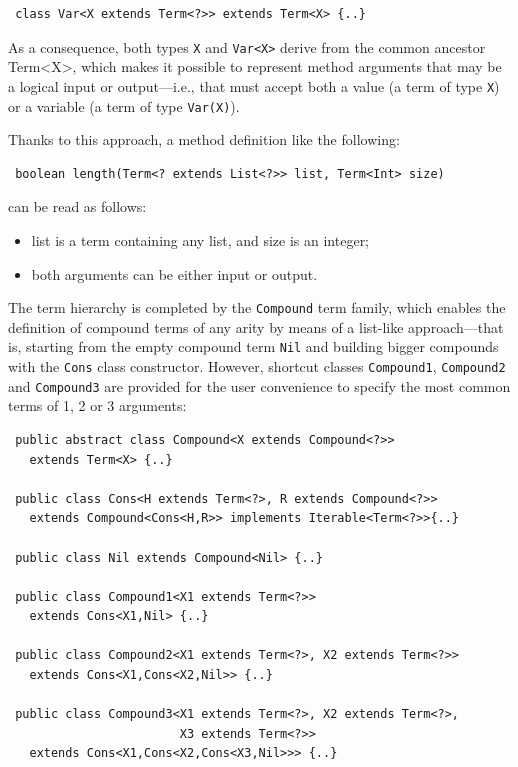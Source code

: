 \begin{verbatim}
 class Var<X extends Term<?>> extends Term<X> {..}
\end{verbatim}

\noindent As a consequence, both types \texttt{X} and \texttt{Var<X>} derive from the common ancestor Term<X>, which makes it possible to represent method arguments that may be a logical input or output---i.e., that must accept both a value (a term of type \texttt{X}) or a variable (a term of type \texttt{Var(X)}).

Thanks to this approach, a method definition like the following:

\begin{verbatim}
 boolean length(Term<? extends List<?>> list, Term<Int> size)
\end{verbatim}

\noindent can be read as follows:

\begin{itemize}
  \item list is a term containing any list, and size is an integer;

  \item both arguments can be either input or output.
\end{itemize}

\noindent The term hierarchy is completed by the \texttt{Compound} term family, which enables the definition of compound terms of any arity by means of a list-like approach---that is, starting from the empty compound term \texttt{Nil} and building bigger compounds with the \texttt{Cons} class constructor.
However, shortcut classes \texttt{Compound1}, \texttt{Compound2} and \texttt{Compound3} are provided for the user convenience to specify the most common terms of 1, 2 or 3 arguments:

\begin{verbatim}
 public abstract class Compound<X extends Compound<?>>
   extends Term<X> {..}

 public class Cons<H extends Term<?>, R extends Compound<?>>
   extends Compound<Cons<H,R>> implements Iterable<Term<?>>{..}

 public class Nil extends Compound<Nil> {..}

 public class Compound1<X1 extends Term<?>>
   extends Cons<X1,Nil> {..}

 public class Compound2<X1 extends Term<?>, X2 extends Term<?>>
   extends Cons<X1,Cons<X2,Nil>> {..}

 public class Compound3<X1 extends Term<?>, X2 extends Term<?>,
                        X3 extends Term<?>>
   extends Cons<X1,Cons<X2,Cons<X3,Nil>>> {..}
\end{verbatim}

